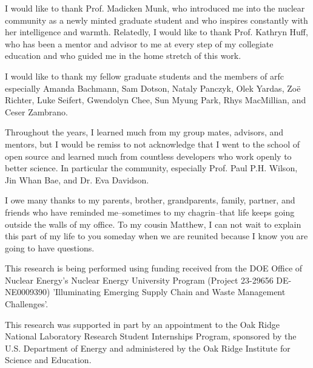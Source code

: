 I would like to thank Prof. Madicken Munk, who introduced me into
the nuclear community as a newly minted graduate student and who inspires
constantly with her intelligence and warmth. Relatedly, I would like to thank
Prof. Kathryn Huff, who has been a mentor and advisor to me at every step of my
collegiate education and who guided me in the home stretch of this work.

I would like to thank my fellow graduate students and the members of
\gls{arfc} especially Amanda Bachmann, Sam Dotson, Nataly Panczyk, Olek Yardas,
Zo\"{e} Richter, Luke Seifert, Gwendolyn Chee, Sun Myung Park, Rhys MacMillian,
and Ceser Zambrano.

Throughout the years, I learned much from my group mates, advisors, and
mentors, but I would be remiss to not acknowledge that I went to the school of
open source and learned much from countless developers who work openly to
better science. In particular the \cyclus community, especially Prof. Paul P.H.
Wilson, Jin Whan Bae, and Dr. Eva Davidson.

I owe many thanks to my parents, brother, grandparents, family, partner, and
friends who have reminded me--sometimes to my chagrin--that life keeps going
outside the walls of my office. To my cousin Matthew, I can not wait to explain
this part of my life to you someday when we are reunited because I know you are
going to have questions.

This research is being performed using funding received from the DOE Office of
Nuclear Energy's Nuclear Energy University Program (Project 23-29656
DE-NE0009390) 'Illuminating Emerging Supply Chain and Waste Management
Challenges'.

This research was supported in part by an appointment to the Oak Ridge National
Laboratory Research Student Internships Program, sponsored by the U.S.
Department of Energy and administered by the Oak Ridge Institute for Science
and Education.